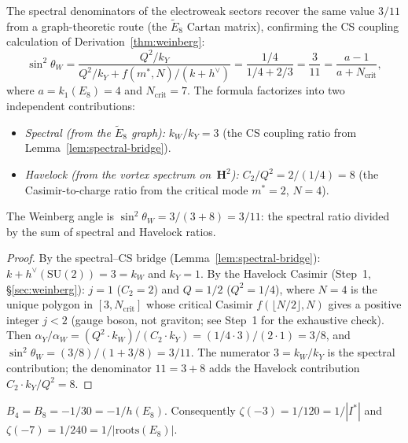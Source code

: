 \begin{corollary}
\label{thm:spectral-weinberg}
The spectral denominators of the electroweak sectors recover
the same value $3/11$ from a graph-theoretic route
(the $\tilde{E}_8$ Cartan matrix), confirming the
CS coupling calculation of Derivation~\ref{thm:weinberg}:
\begin{equation}\label{eq:spectral-weinberg}
  \sin^2\theta_W
  = \frac{Q^2/k_Y}{Q^2/k_Y + f(m^*,N)/(k{+}h^\vee)}
  = \frac{1/4}{1/4 + 2/3}
  = \frac{3}{11}
  = \frac{a-1}{a + N_{\mathrm{crit}}},
\end{equation}
where $a = k_1(E_8) = 4$ and $N_{\mathrm{crit}} = 7$.
The formula factorizes into two independent contributions:
\begin{itemize}
\item \emph{Spectral (from the $\tilde{E}_8$ graph):}
  $k_W/k_Y = 3$ (the CS coupling ratio from Lemma~\ref{lem:spectral-bridge}).
\item \emph{Havelock (from the vortex spectrum on~$\mathbf{H}^2$):}
  $C_2/Q^2 = 2/(1/4) = 8$ (the Casimir-to-charge ratio from the
  critical mode $m^* = 2$, $N = 4$).
\end{itemize}
The Weinberg angle is $\sin^2\theta_W = 3/(3 + 8) = 3/11$:
the spectral ratio divided by the sum of spectral and Havelock ratios.
\end{corollary}

\begin{proof}
By the spectral--CS bridge (Lemma~\ref{lem:spectral-bridge}):
$k + h^\vee(\mathrm{SU}(2)) = 3 = k_W$ and $k_Y = 1$.
By the Havelock Casimir (Step~1, \S\ref{sec:weinberg}):
$j = 1$ ($C_2 = 2$) and $Q = 1/2$ ($Q^2 = 1/4$),
where $N = 4$ is the unique polygon in $[3, N_{\mathrm{crit}}]$
whose critical Casimir $f(\lfloor N/2\rfloor, N)$ gives a
positive integer $j < 2$ (gauge boson, not graviton;
see Step~1 for the exhaustive check).
Then $\alpha_Y/\alpha_W = (Q^2 \cdot k_W)/(C_2 \cdot k_Y)
= (1/4 \cdot 3)/(2 \cdot 1) = 3/8$,
and $\sin^2\theta_W = (3/8)/(1 + 3/8) = 3/11$.
The numerator $3 = k_W/k_Y$ is the spectral contribution;
the denominator $11 = 3 + 8$ adds the Havelock contribution
$C_2 \cdot k_Y / Q^2 = 8$.
\end{proof}

\begin{lemma}\label{lem:bernoulli-coxeter}
$B_4 = B_8 = -1/30 = -1/h(E_8)$.
Consequently $\zeta(-3) = 1/120 = 1/|I^*|$ and
$\zeta(-7) = 1/240 = 1/|\text{roots}(E_8)|$.
\end{lemma}

